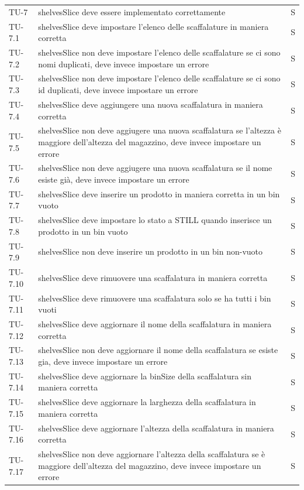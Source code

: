 \begin{xltabular}{0.9\textwidth}{X | p{0.6\textwidth} | p{0.1\textwidth} }
    TU-7 & shelvesSlice deve essere implementato correttamente & S\\
    TU-7.1 & shelvesSlice deve impostare l'elenco delle scaffalature in maniera corretta & S\\
    TU-7.2 & shelvesSlice non deve impostare l'elenco delle scaffalature se ci sono nomi duplicati, deve invece impostare un errore & S\\
    TU-7.3 & shelvesSlice non deve impostare l'elenco delle scaffalature se ci sono id duplicati, deve invece impostare un errore & S\\
    TU-7.4 & shelvesSlice deve aggiungere una nuova scaffalatura in maniera corretta & S\\
    TU-7.5 & shelvesSlice non deve aggiugere una nuova scaffalatura se l'altezza è maggiore dell'altezza del magazzino, deve invece impostare un errore & S\\
    TU-7.6 & shelvesSlice non deve aggiugere una nuova scaffalatura se il nome esiste già, deve invece impostare un errore & S\\
    TU-7.7 & shelvesSlice deve inserire un prodotto in maniera corretta in un bin vuoto & S\\
    TU-7.8 & shelvesSlice deve impostare lo stato a STILL quando inserisce un prodotto in un bin vuoto & S\\
    TU-7.9 & shelvesSlice non deve inserire un prodotto in un bin non-vuoto & S\\
    TU-7.10 & shelvesSlice deve rimuovere una scaffalatura in maniera corretta & S\\
    TU-7.11 & shelvesSlice deve rimuovere una scaffalatura solo se ha tutti i  bin vuoti & S\\
    TU-7.12 & shelvesSlice deve aggiornare il nome della scaffalatura in maniera corretta & S\\
    TU-7.13 & shelvesSlice non deve aggiornare il nome della scaffalatura se esiste gia, deve invece impostare un errore & S\\
    TU-7.14 & shelvesSlice deve aggiornare la binSize della scaffalatura sin maniera corretta& S\\
    TU-7.15 & shelvesSlice deve aggiornare la larghezza della scaffalatura in maniera corretta & S\\
    TU-7.16 & shelvesSlice deve aggiornare l'altezza della scaffalatura in maniera corretta & S\\
    TU-7.17 & shelvesSlice non deve aggiornare l'altezza della scaffalatura se è maggiore dell'altezza del magazzino, deve invece impostare un errore & S\\

\end{xltabular}
